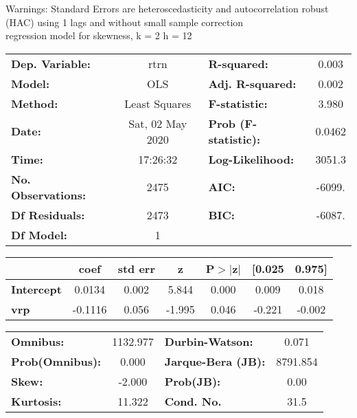 Warnings: \newline
 [1] Standard Errors are heteroscedasticity and autocorrelation robust (HAC) using 1 lags and without small sample correction\\ 

regression model for skewness, k = 2 h = 12\begin{center}
\begin{tabular}{lclc}
\toprule
\textbf{Dep. Variable:}    &       rtrn       & \textbf{  R-squared:         } &     0.003   \\
\textbf{Model:}            &       OLS        & \textbf{  Adj. R-squared:    } &     0.002   \\
\textbf{Method:}           &  Least Squares   & \textbf{  F-statistic:       } &     3.980   \\
\textbf{Date:}             & Sat, 02 May 2020 & \textbf{  Prob (F-statistic):} &   0.0462    \\
\textbf{Time:}             &     17:26:32     & \textbf{  Log-Likelihood:    } &    3051.3   \\
\textbf{No. Observations:} &        2475      & \textbf{  AIC:               } &    -6099.   \\
\textbf{Df Residuals:}     &        2473      & \textbf{  BIC:               } &    -6087.   \\
\textbf{Df Model:}         &           1      & \textbf{                     } &             \\
\bottomrule
\end{tabular}
\begin{tabular}{lcccccc}
                   & \textbf{coef} & \textbf{std err} & \textbf{z} & \textbf{P$> |$z$|$} & \textbf{[0.025} & \textbf{0.975]}  \\
\midrule
\textbf{Intercept} &       0.0134  &        0.002     &     5.844  &         0.000        &        0.009    &        0.018     \\
\textbf{vrp}       &      -0.1116  &        0.056     &    -1.995  &         0.046        &       -0.221    &       -0.002     \\
\bottomrule
\end{tabular}
\begin{tabular}{lclc}
\textbf{Omnibus:}       & 1132.977 & \textbf{  Durbin-Watson:     } &    0.071  \\
\textbf{Prob(Omnibus):} &   0.000  & \textbf{  Jarque-Bera (JB):  } & 8791.854  \\
\textbf{Skew:}          &  -2.000  & \textbf{  Prob(JB):          } &     0.00  \\
\textbf{Kurtosis:}      &  11.322  & \textbf{  Cond. No.          } &     31.5  \\
\bottomrule
\end{tabular}
\end{center}

